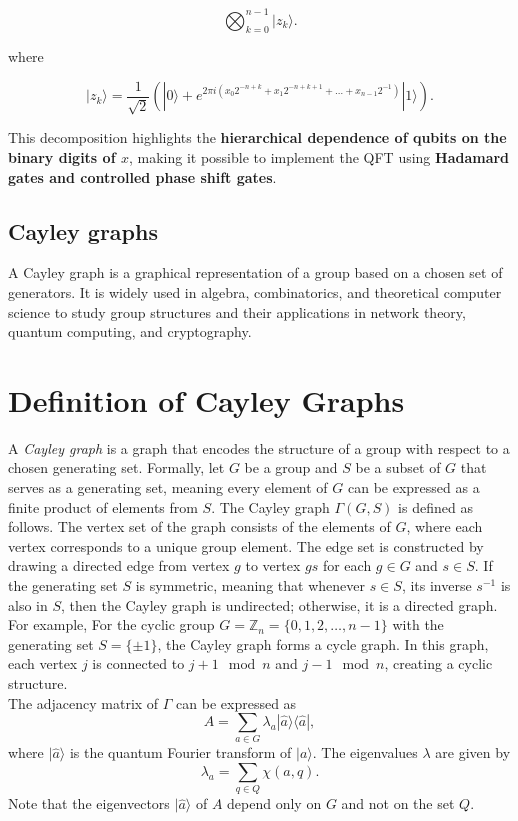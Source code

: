 \documentclass[11pt]{article}
\theoremstyle{definition}
\begin{document}
\[
\bigotimes_{k=0}^{n-1} | z_k \rangle.
\]

where

\[
| z_k \rangle = \frac{1}{\sqrt{2}} ( | 0 \rangle + e^{2\pi i ( x_0 2^{-n+k} + x_1 2^{-n+k+1} + \dots + x_{n-1} 2^{-1} )} | 1 \rangle ).
\]

This decomposition highlights the \textbf{hierarchical dependence of qubits on the binary digits of \( x \)}, making it possible to implement the QFT using \textbf{Hadamard gates and controlled phase shift gates}.


\subsection*{Cayley graphs}

A Cayley graph is a graphical representation of a group based on a chosen set of generators. It is widely used in algebra, combinatorics, and theoretical computer science to study group structures and their applications in network theory, quantum computing, and cryptography.


\section*{Definition of Cayley Graphs}

A \textit{Cayley graph} is a graph that encodes the structure of a group with respect to a chosen generating set. Formally, let \( G \) be a group and \( S \) be a subset of \( G \) that serves as a generating set, meaning every element of \( G \) can be expressed as a finite product of elements from \( S \). The Cayley graph \( \Gamma(G, S) \) is defined as follows. The vertex set of the graph consists of the elements of \( G \), where each vertex corresponds to a unique group element. The edge set is constructed by drawing a directed edge from vertex \( g \) to vertex \( gs \) for each \( g \in G \) and \( s \in S \). If the generating set \( S \) is symmetric, meaning that whenever \( s \in S \), its inverse \( s^{-1} \) is also in \( S \), then the Cayley graph is undirected; otherwise, it is a directed graph.
For example, For the cyclic group \( G = \mathbb{Z}_n = \{0,1,2,\dots, n-1\} \) with the generating set \( S = \{\pm 1\} \), the Cayley graph forms a cycle graph. In this graph, each vertex \( j \) is connected to \( j+1 \mod n \) and \( j-1 \mod n \), creating a cyclic structure.\\


The adjacency matrix of $\Gamma$ can be expressed as
\[
A = \sum_{a \in G} \lambda_a |\hat{a}\rangle \langle \hat{a}|,
\]
where $|\hat{a}\rangle$ is the quantum Fourier transform of $|a\rangle$. The eigenvalues $\lambda$ are given by
\[
\lambda_a = \sum_{q \in Q} \chi(a, q).
\]
Note that the eigenvectors $|\hat{a}\rangle$ of $A$ depend only on $G$ and not on the set $Q$.
\end{document}
